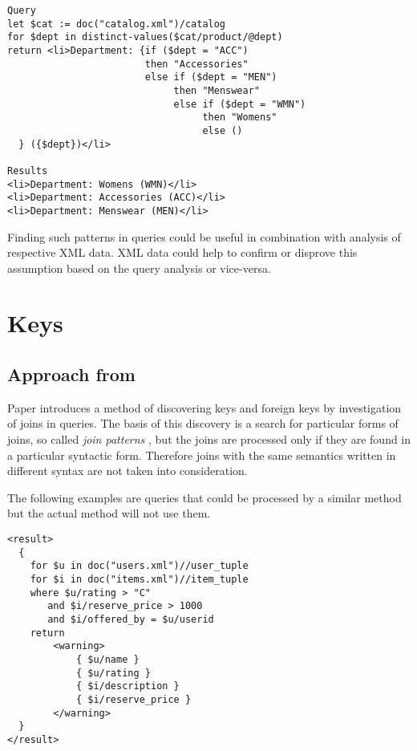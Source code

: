 \begin{verbatim}
Query
let $cat := doc("catalog.xml")/catalog 
for $dept in distinct-values($cat/product/@dept) 
return <li>Department: {if ($dept = "ACC") 
                        then "Accessories" 
                        else if ($dept = "MEN") 
                             then "Menswear" 
                             else if ($dept = "WMN") 
                                  then "Womens" 
                                  else () 
  } ({$dept})</li> 

Results 
<li>Department: Womens (WMN)</li> 
<li>Department: Accessories (ACC)</li> 
<li>Department: Menswear (MEN)</li> 
\end{verbatim}

Finding such patterns in queries could be useful in combination with analysis of respective XML data. XML data could help to confirm or disprove this assumption based on the query analysis or vice-versa.

\section{Keys}

\subsection{Approach from \cite{Necasky:2009:DXK:1529282.1529414}}
Paper \cite{Necasky:2009:DXK:1529282.1529414} introduces a method of discovering keys and foreign keys by investigation of joins in queries. The basis of this discovery is a search for particular forms of joins, so called \emph{join patterns} , but the joins are processed only if they are found in a particular syntactic form. Therefore joins with the same semantics written in different syntax are not taken into consideration.

The following examples are queries that could be processed by a similar method but the actual method will not use them.

\begin{verbatim}
<result>
  {
    for $u in doc("users.xml")//user_tuple
    for $i in doc("items.xml")//item_tuple
    where $u/rating > "C" 
       and $i/reserve_price > 1000 
       and $i/offered_by = $u/userid
    return
        <warning>
            { $u/name }
            { $u/rating }
            { $i/description }
            { $i/reserve_price }
        </warning>
  }
</result>
\end{verbatim}

